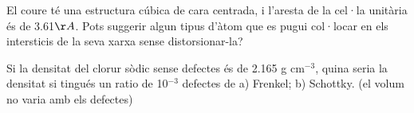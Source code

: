 \begin{exr}
El coure té una estructura cúbica de cara centrada, i l'aresta de la cel·la unitària és de 3.61${\AA}$. Pots suggerir algun tipus d'àtom que es pugui col·locar en els  intersticis de la seva xarxa sense distorsionar-la?
\end{exr}

\begin{exr}
Si la densitat del clorur sòdic sense defectes és de 2.165 g cm$^{-3}$, quina seria la densitat si tingués un ratio de 10$^{-3}$ defectes de a) Frenkel; b) Schottky. (el volum no varia amb els defectes)
\end{exr}